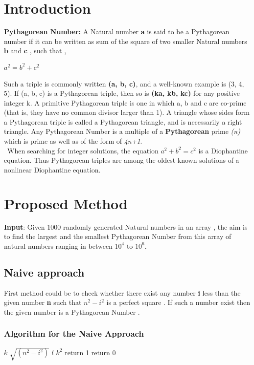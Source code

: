 \documentclass[twocolumn]{article}      %
\begin{document}
\section{Introduction}
{ \textbf{Pythagorean Number:}} A Natural number \textbf{a} is said to be a Pythagorean number if it can be written as sum of the square of two smaller Natural numbers \textbf{b} and \textbf{c} , such that ,
\begin{center}\textbf{$a^2 = b^2 + c^2$}\end{center}
Such a triple is commonly written \textbf{(a, b, c)}, and a well-known example is (3, 4, 5). If (a, b, c) is a Pythagorean triple, then so is \textbf{(ka, kb, kc)} for any positive integer k. A primitive Pythagorean triple is one in which a, b and c are co-prime (that is, they have no common divisor larger than 1). A triangle whose sides form a Pythagorean triple is called a Pythagorean triangle, and is necessarily a right triangle. Any Pythagorean Number is a multiple of a \textbf{Pythagorean} prime \textit{(n)} which is prime as well as of the form of \textit{4n+1}.\\\ When searching for integer solutions, the equation \textbf{$a^2 + b^2 = c^2$} is a Diophantine equation. Thus Pythagorean triples are among the oldest known solutions of a nonlinear Diophantine equation.
\section{Proposed Method}
\textbf{Input}: Given 1000 randomly generated Natural numbers in an array , the aim is to find the largest and the smallest Pythagorean Number from this array of natural numbers ranging in between $10^4$ to $10^6$.
\subsection {Naive approach}
First method could be to check whether there exist any number \textbf{i} less than  the given number \textbf{n} such that $n^2 - i^2$ is a perfect square . If such a number exist then the given number is a Pythagorean Number . 
\subsubsection{Algorithm for the Naive Approach}
\begin{algorithm}
\begin{algorithmic}[1]
\State $k$ \gets \hspace{2pt} $\sqrt{(n^2 - i^2)}$
\State $l$ \gets \hspace{2pt} $k^2$
\State return 1
\EndIf
\EndFor
\State return 0
\EndProcedure
\end{algorithmic}
\end{algorithm}
\end{document}
